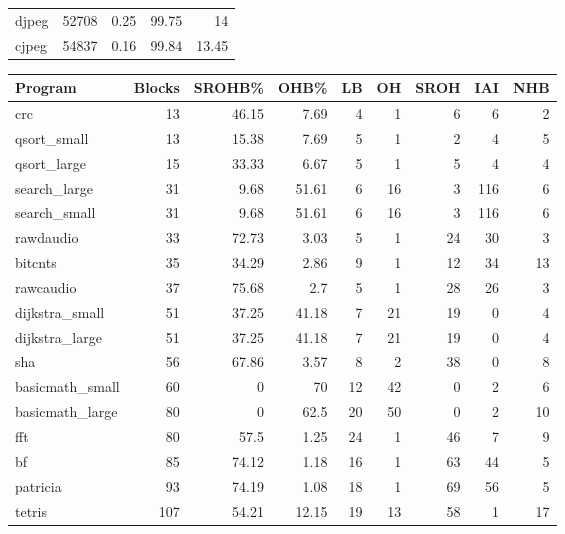 \begin{tabular}{lrrrr}
 djpeg           &   52708 &   0.25 &        99.75 &   14    \\
 cjpeg           &   54837 &   0.16 &        99.84 &   13.45 \\
\hline
\end{tabular}\begin{tabular}{lrrrrrrrr}
\hline
 Program         &   Blocks &   SROHB\% &   OHB\% &   LB &   OH &   SROH &   IAI &   NHB \\
\hline
 crc             &       13 &    46.15 &   7.69 &    4 &    1 &      6 &     6 &     2 \\
 qsort\_small     &       13 &    15.38 &   7.69 &    5 &    1 &      2 &     4 &     5 \\
 qsort\_large     &       15 &    33.33 &   6.67 &    5 &    1 &      5 &     4 &     4 \\
 search\_large    &       31 &     9.68 &  51.61 &    6 &   16 &      3 &   116 &     6 \\
 search\_small    &       31 &     9.68 &  51.61 &    6 &   16 &      3 &   116 &     6 \\
 rawdaudio       &       33 &    72.73 &   3.03 &    5 &    1 &     24 &    30 &     3 \\
 bitcnts         &       35 &    34.29 &   2.86 &    9 &    1 &     12 &    34 &    13 \\
 rawcaudio       &       37 &    75.68 &   2.7  &    5 &    1 &     28 &    26 &     3 \\
 dijkstra\_small  &       51 &    37.25 &  41.18 &    7 &   21 &     19 &     0 &     4 \\
 dijkstra\_large  &       51 &    37.25 &  41.18 &    7 &   21 &     19 &     0 &     4 \\
 sha             &       56 &    67.86 &   3.57 &    8 &    2 &     38 &     0 &     8 \\
 basicmath\_small &       60 &     0    &  70    &   12 &   42 &      0 &     2 &     6 \\
 basicmath\_large &       80 &     0    &  62.5  &   20 &   50 &      0 &     2 &    10 \\
 fft             &       80 &    57.5  &   1.25 &   24 &    1 &     46 &     7 &     9 \\
 bf              &       85 &    74.12 &   1.18 &   16 &    1 &     63 &    44 &     5 \\
 patricia        &       93 &    74.19 &   1.08 &   18 &    1 &     69 &    56 &     5 \\
 tetris          &      107 &    54.21 &  12.15 &   19 &   13 &     58 &     1 &    17 \\

\end{tabular}
